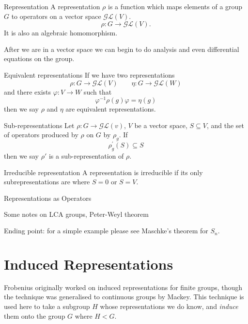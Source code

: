 \documentclass{article}
\begin{document}
\begin{Define}{Representation}
    A representation $\rho$ is a function which maps elements of a group $G$ to operators on a vector space $\mathcal{GL}(V)$. \[ \rho : G \rightarrow \mathcal{GL}(V) .\]
    It is also an algebraic homomorphism. 
\end{Define}
After we are in a vector space we can begin to do analysis and even differential equations on the group.\par

\begin{Define}{Equivalent representations}
    If we have two representations
    \[%
        \rho : G \rightarrow \mathcal{GL}(V) 
        \qquad
        \eta : G \rightarrow \mathcal{GL}(W)
    \]%
    and there exists $\varphi : V \rightarrow W$ such that 
    \[%
        \varphi^{-1} \rho(g) \varphi = \eta(g)
    \]%
    then we say $\rho$ and $\eta$ are equivalent representations.
\end{Define}

\begin{Define}{Sub-representations}
    Let $\rho : G \rightarrow \mathcal{GL}(v)$, $V$ be a vector space, $S \subseteq V$, and the set of operators produced by $\rho$ on $G$ by $\rho_{g}$. If 
    \[%
        \rho^{'}_{g}(S) \subseteq S
    \]%
    then we say $\rho'$ is a sub-representation of $\rho$.
\end{Define}

\begin{Define}{Irreducible representation}
    A representation is irreducible if its only subrepresentations are where $S=0$ or $S=V$.
\end{Define}

\begin{Remark}{Representations as Operators}
    
\end{Remark}

\begin{Remark}{Some notes on LCA groups, Peter-Weyl theorem}

    Ending point: for a simple example please see Maschke's theorem for $S_{n}$.
\end{Remark}


\section{Induced Representations} 
\label{sec:induced_representations}
Frobenius originally worked on induced representations for finite groups, though the technique was generalised to continuous groups by Mackey. This technique is used here to take a subgroup $H$ whose representations we do know, and \textit{induce} them onto the group $G$ where $H < G$. 
\end{document}

